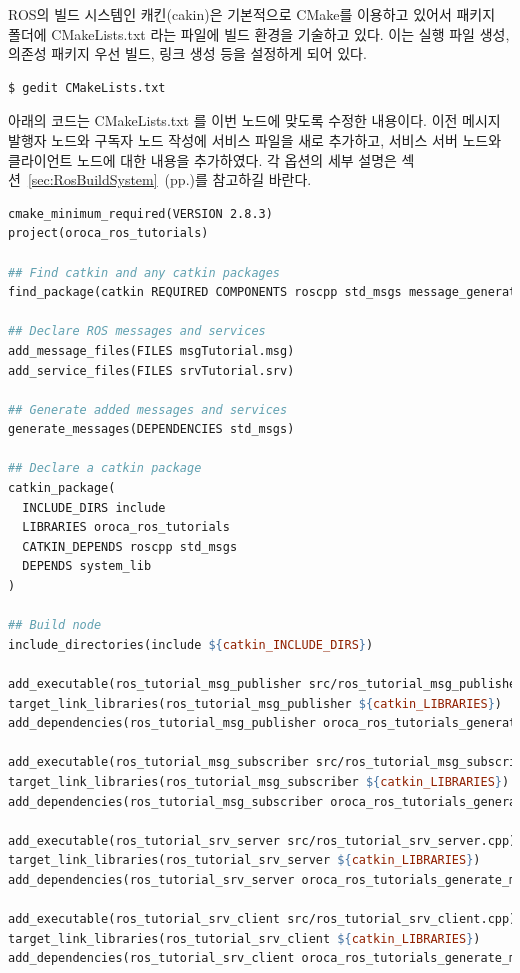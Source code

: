 ROS의 빌드 시스템인 캐킨(cakin)은 기본적으로 CMake를 이용하고 있어서 패키지 폴더에 CMakeLists.txt 라는 파일에 빌드 환경을 기술하고 있다. 이는 실행 파일 생성, 의존성 패키지 우선 빌드, 링크 생성 등을 설정하게 되어 있다.

\begin{lstlisting}[language=ROS]
$ gedit CMakeLists.txt 
\end{lstlisting}

아래의 코드는 CMakeLists.txt 를 이번 노드에 맞도록 수정한 내용이다. 이전 메시지 발행자 노드와 구독자 노드 작성에 서비스 파일을 새로 추가하고, 서비스 서버 노드와 클라이언트 노드에 대한 내용을 추가하였다. 각 옵션의 세부 설명은 섹션~\ref{sec:RosBuildSystem}~(pp.\pageref{sec:RosBuildSystem})를 참고하길 바란다.

\begin{lstlisting}[language=make]
cmake_minimum_required(VERSION 2.8.3)
project(oroca_ros_tutorials)

## Find catkin and any catkin packages
find_package(catkin REQUIRED COMPONENTS roscpp std_msgs message_generation)

## Declare ROS messages and services
add_message_files(FILES msgTutorial.msg)
add_service_files(FILES srvTutorial.srv)

## Generate added messages and services
generate_messages(DEPENDENCIES std_msgs)

## Declare a catkin package
catkin_package(
  INCLUDE_DIRS include
  LIBRARIES oroca_ros_tutorials
  CATKIN_DEPENDS roscpp std_msgs
  DEPENDS system_lib
)

## Build node
include_directories(include ${catkin_INCLUDE_DIRS})

add_executable(ros_tutorial_msg_publisher src/ros_tutorial_msg_publisher.cpp)
target_link_libraries(ros_tutorial_msg_publisher ${catkin_LIBRARIES})
add_dependencies(ros_tutorial_msg_publisher oroca_ros_tutorials_generate_messages_cpp)

add_executable(ros_tutorial_msg_subscriber src/ros_tutorial_msg_subscriber.cpp)
target_link_libraries(ros_tutorial_msg_subscriber ${catkin_LIBRARIES})
add_dependencies(ros_tutorial_msg_subscriber oroca_ros_tutorials_generate_messages_cpp)

add_executable(ros_tutorial_srv_server src/ros_tutorial_srv_server.cpp)
target_link_libraries(ros_tutorial_srv_server ${catkin_LIBRARIES})
add_dependencies(ros_tutorial_srv_server oroca_ros_tutorials_generate_messages_cpp)

add_executable(ros_tutorial_srv_client src/ros_tutorial_srv_client.cpp)
target_link_libraries(ros_tutorial_srv_client ${catkin_LIBRARIES})
add_dependencies(ros_tutorial_srv_client oroca_ros_tutorials_generate_messages_cpp)
\end{lstlisting}

